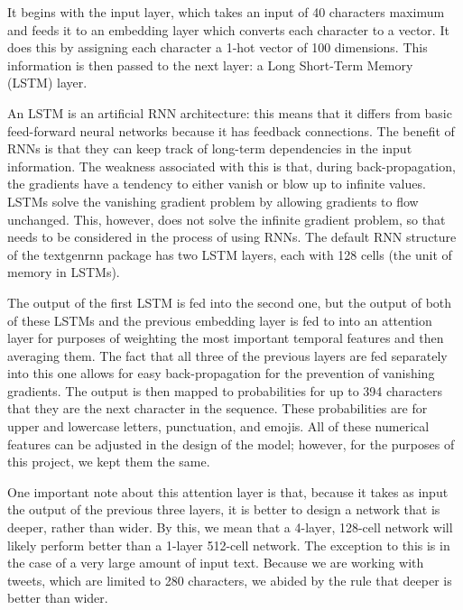 \documentclass[%
 reprint,
 amsmath,amssymb,
 aps,
]{revtex4-2}
\begin{document}
It begins with the input layer, which takes an input of 40 characters maximum and feeds it to an embedding layer which converts each character to a vector. It does this by assigning each character a 1-hot vector of 100 dimensions. This information is then passed to the next layer: a Long Short-Term Memory (LSTM) layer. \cite{textgenrnnDoc}

An LSTM is an artificial RNN architecture: this means that it differs from basic feed-forward neural networks because it has feedback connections. The benefit of RNNs is that they can keep track of long-term dependencies in the input information. The weakness associated with this is that, during back-propagation, the gradients have a tendency to either vanish or blow up to infinite values. LSTMs solve the vanishing gradient problem by allowing gradients to flow unchanged. This, however, does not solve the infinite gradient problem, so that needs to be considered in the process of using RNNs. The default RNN structure of the textgenrnn package has two LSTM layers, each with 128 cells (the unit of memory in LSTMs).\cite{LSTMpaper}

The output of the first LSTM is fed into the second one, but the output of both of these LSTMs and the previous embedding layer is fed to into an attention layer for purposes of weighting the most important temporal features and then averaging them. The fact that all three of the previous layers are fed separately into this one allows for easy back-propagation for the prevention of vanishing gradients. The output is then mapped to probabilities for up to 394 characters that they are the next character in the sequence. These probabilities are for upper and lowercase letters, punctuation, and emojis. All of these numerical features can be adjusted in the design of the model; however, for the purposes of this project, we kept them the same. \cite{textgenrnnDoc}

One important note about this attention layer is that, because it takes as input the output of the previous three layers, it is better to design a network that is deeper, rather than wider. By this, we mean that a 4-layer, 128-cell network will likely perform better than a 1-layer 512-cell network. The exception to this is in the case of a very large amount of input text. Because we are working with tweets, which are limited to 280 characters, we abided by the rule that deeper is better than wider. \cite{maxWoolfBlog}
\end{document}
